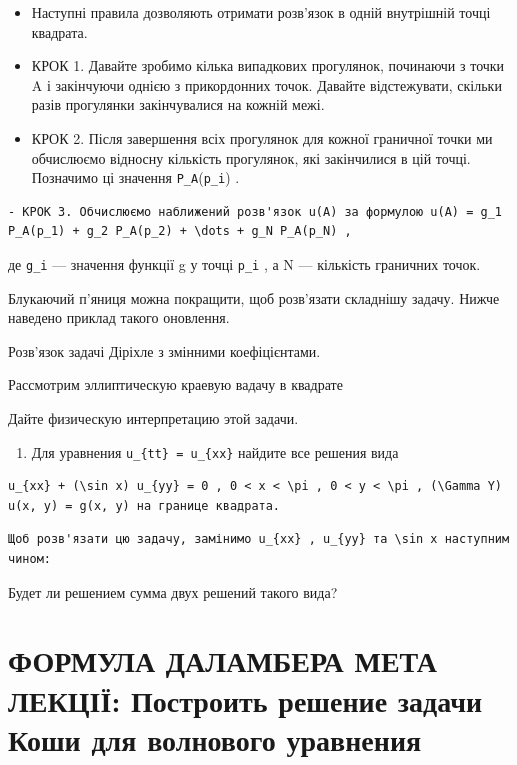 \documentclass[
  ukrainian,
]{article}
\providecommand{\tightlist}{%
  \setlength{\itemsep}{0pt}\setlength{\parskip}{0pt}}
\begin{document}
\begin{itemize}
\item
  Наступні правила дозволяють отримати розв'язок в одній внутрішній
  точці квадрата.
\item
  КРОК 1. Давайте зробимо кілька випадкових прогулянок, починаючи з
  точки A і закінчуючи однією з прикордонних точок. Давайте
  відстежувати, скільки разів прогулянки закінчувалися на кожній межі.
\item
  КРОК 2. Після завершення всіх прогулянок для кожної граничної точки ми
  обчислюємо відносну кількість прогулянок, які закінчилися в цій точці.
  Позначимо ці значення \texttt{P\_A}(\texttt{p\_i}) .
\end{itemize}

\begin{verbatim}
- КРОК 3. Обчислюємо наближений розв'язок u(A) за формулою u(A) = g_1 P_A(p_1) + g_2 P_A(p_2) + \dots + g_N P_A(p_N) ,
\end{verbatim}

де \texttt{g\_i} --- значення функції g у точці \texttt{p\_i} , а N ---
кількість граничних точок.

Блукаючий п'яниця можна покращити, щоб розв'язати складнішу задачу.
Нижче наведено приклад такого оновлення.

Розв'язок задачі Діріхле з змінними коефіцієнтами.

Рассмотрим эллиптическую краевую вадачу в квадрате

Дайте физическую интерпретацию этой задачи.

\begin{enumerate}
\def\labelenumi{\arabic{enumi}.}
\setcounter{enumi}{3}
\tightlist
\item
  Для уравнения \texttt{u\_\{tt\}\ =\ u\_\{xx\}} найдите все решения
  вида
\end{enumerate}

\begin{verbatim}
u_{xx} + (\sin x) u_{yy} = 0 , 0 < x < \pi , 0 < y < \pi , (\Gamma Y) u(x, y) = g(x, y) на границе квадрата.
\end{verbatim}

\begin{verbatim}
Щоб розв'язати цю задачу, замінимо u_{xx} , u_{yy} та \sin x наступним чином:
\end{verbatim}

Будет ли решением сумма двух решений такого вида?

\section{ФОРМУЛА ДАЛАМБЕРА МЕТА ЛЕКЦІЇ: Построить решение задачи Коши
для волнового
уравнения}\label{ux444ux43eux440ux43cux443ux43bux430-ux434ux430ux43bux430ux43cux431ux435ux440ux430-ux43cux435ux442ux430-ux43bux435ux43aux446ux456ux457-ux43fux43eux441ux442ux440ux43eux438ux442ux44c-ux440ux435ux448ux435ux43dux438ux435-ux437ux430ux434ux430ux447ux438-ux43aux43eux448ux438-ux434ux43bux44f-ux432ux43eux43bux43dux43eux432ux43eux433ux43e-ux443ux440ux430ux432ux43dux435ux43dux438ux44f}
\end{document}
